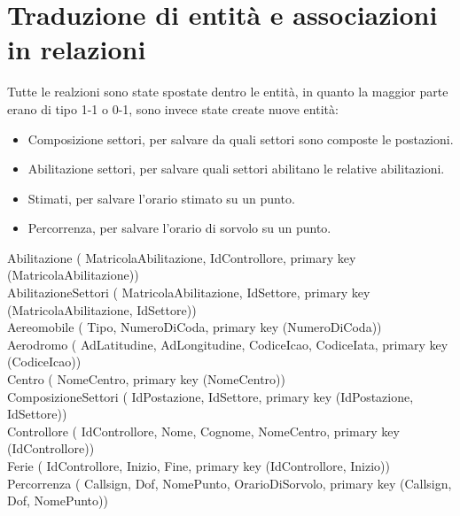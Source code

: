 \section{Traduzione di entità e associazioni in relazioni}
Tutte le realzioni sono state spostate dentro le entità, in quanto la maggior parte erano di tipo 1-1 o 0-1,
sono invece state create nuove entità:
\begin{itemize}
  \item Composizione settori, per salvare da quali settori sono composte le postazioni.
  \item Abilitazione settori, per salvare quali settori abilitano le relative abilitazioni.
  \item Stimati, per salvare l'orario stimato su un punto.
  \item Percorrenza, per salvare l'orario di sorvolo su un punto.
\end{itemize}

Abilitazione (
     MatricolaAbilitazione,
     IdControllore,
     primary key (MatricolaAbilitazione))\\

AbilitazioneSettori (
     MatricolaAbilitazione,
     IdSettore,
     primary key (MatricolaAbilitazione, IdSettore))\\

Aereomobile (
     Tipo,
     NumeroDiCoda,
     primary key (NumeroDiCoda))\\

Aerodromo (
     AdLatitudine,
     AdLongitudine,
     CodiceIcao,
     CodiceIata,
     primary key (CodiceIcao))\\

Centro (
     NomeCentro,
     primary key (NomeCentro))\\

ComposizioneSettori (
     IdPostazione,
     IdSettore,
     primary key (IdPostazione, IdSettore))\\

Controllore (
     IdControllore,
     Nome,
     Cognome,
     NomeCentro,
     primary key (IdControllore))\\

Ferie (
     IdControllore,
     Inizio,
     Fine,
     primary key (IdControllore, Inizio))\\

Percorrenza (
     Callsign,
     Dof,
     NomePunto,
     OrarioDiSorvolo,
     primary key (Callsign, Dof, NomePunto))\\

